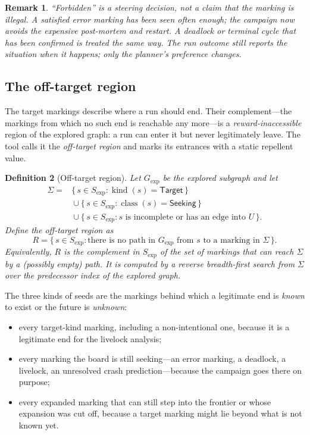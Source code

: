 \documentclass[11pt,a4paper]{article}
\newtheorem{definition}{Definition}[section]
\newtheorem{remark}[definition]{Remark}
\newcommand{\Seeds}{\Sigma}
\newcommand{\Off}{R}
\newcommand{\kind}{\operatorname{kind}}
\newcommand{\cls}{\operatorname{class}}
\begin{document}
\begin{remark}
``Forbidden'' is a steering decision, not a claim that the marking is
illegal.  A satisfied error marking has been seen often enough; the campaign
now avoids
the expensive post-mortem and restart.  A deadlock or terminal cycle that has
been confirmed is treated the same way.  The run outcome still reports the
situation when it happens; only the planner's preference changes.
\end{remark}

\subsection{The off-target region}\label{sec:offtarget}

The target markings describe where a run should end.  Their complement---the
markings from which no such end is reachable any more---is a
\emph{reward-inaccessible} region of the explored graph: a run can enter it
but never legitimately leave.  The tool calls it the \emph{off-target region}
and marks its entrances with a static repellent value.

\begin{definition}[Off-target region]\label{def:offtarget}
Let $G_{\mathrm{exp}}$ be the explored subgraph and let
\[
  \begin{aligned}
    \Seeds={}&
    \{\,s\in S_{\mathrm{exp}}:\kind(s)=\mathsf{Target}\,\}\\
    &{}\cup
    \{\,s\in S_{\mathrm{exp}}:\cls(s)=\mathsf{Seeking}\,\}\\
    &{}\cup
    \{\,s\in S_{\mathrm{exp}}:
        s\text{ is incomplete or has an edge into }U\,\}.
  \end{aligned}
\]
Define the \emph{off-target region} as
\[
  \Off=\{\,s\in S_{\mathrm{exp}}:\text{there is no path in }
        G_{\mathrm{exp}}\text{ from }s\text{ to a marking in }\Seeds\,\}.
\]
Equivalently, $\Off$ is the complement in $S_{\mathrm{exp}}$ of the set of
markings that can reach $\Seeds$ by a (possibly empty) path.  It is computed by
a reverse breadth-first search from $\Seeds$ over the predecessor index of the
explored graph.
\end{definition}

The three kinds of seeds are the markings behind which a legitimate end is
\emph{known} to exist or the future is \emph{unknown}:

\begin{itemize}
  \item every target-kind marking, including a non-intentional one, because it
        is a legitimate end for the livelock analysis;
  \item every marking the board is still seeking---an error marking, a
        deadlock, a livelock, an unresolved crash prediction---because the
        campaign goes there on purpose;
  \item every expanded marking that can still step into the frontier or whose
        expansion was cut off, because a target marking might lie beyond what
        is not known yet.
\end{itemize}
\end{document}
